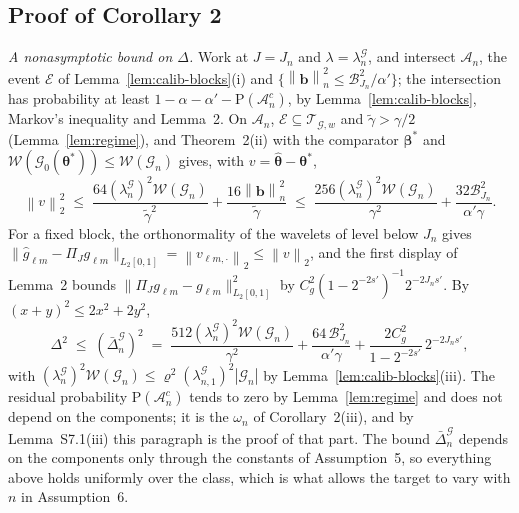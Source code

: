 \documentclass[10pt]{book}
\theoremstyle{definition}
\newcommand{\Prob}{\mathrm{P}}
\newcommand{\norm}[1]{\left\lVert #1 \right\rVert}
\newcommand{\normn}[1]{\left\lVert #1 \right\rVert_{n}}
\newcommand{\cv}{\ell}
\newcommand{\md}{m}
\newcommand{\gcomp}[2]{g_{#1#2}}
\newcommand{\PiJ}{\Pi_{J}}
\newcommand{\btheta}{\boldsymbol{\theta}}
\newcommand{\thetastar}{\btheta^{*}}
\newcommand{\thetahat}{\widehat{\btheta}}
\newcommand{\bbeta}{\boldsymbol{\beta}}
\newcommand{\betastar}{\bbeta^{*}}
\newcommand{\pen}{\lambda}
\newcommand{\seff}{s'}
\newcommand{\bb}{\mathbf{b}}
\newcommand{\gtil}{\widetilde{\gamma}}
\newcommand{\Gcal}{\mathcal{G}}
\newcommand{\Gzero}{\mathcal{G}_{0}}
\newcommand{\Wcal}{\mathcal{W}}
\newcommand{\lamG}{\lambda^{\mathcal{G}}_{n}}
\newcommand{\lamGone}{\lambda^{\mathcal{G}}_{n,1}}
\newcommand{\Tw}{\mathcal{T}_{\mathcal{G},w}}
\newcommand{\Ecal}{\mathcal{E}}
\newcommand{\Acal}{\mathcal{A}_{n}}
\begin{document}
{{\color{gray}\noindent[k = 4: the proof of Corollary~2 for the lasso, which stood
here, is moved to Section~S8, unchanged except for the numbering of the results
it cites.]\par}

\subsection*{Proof of Corollary 2}

\emph{A nonasymptotic bound on $\Delta$.} Work at $J = J_n$ and
$\pen = \lamG$, and intersect $\Acal$, the event $\Ecal$ of
Lemma~\ref{lem:calib-blocks}(i) and
$\{\normn{\bb}^{2} \le \mathcal{B}_{J_n}^{2}/\alpha'\}$; the intersection has
probability at least $1 - \alpha - \alpha' - \Prob(\Acal^{c})$, by
Lemma~\ref{lem:calib-blocks}, Markov's inequality and Lemma~2. On $\Acal$,
$\Ecal \subseteq \Tw$ and $\gtil > \gamma/2$ (Lemma~\ref{lem:regime}), and
Theorem~2(ii) with the comparator $\betastar$ and
$\Wcal(\Gzero(\thetastar)) \le \Wcal(\Gcal_{n})$ gives, with
$v = \thetahat - \thetastar$,
\[
  \norm{v}_{2}^{2} \;\le\; \frac{64(\lamG)^{2}\Wcal(\Gcal_{n})}{\gtil^{2}}
  + \frac{16\normn{\bb}^{2}}{\gtil}
  \;\le\; \frac{256(\lamG)^{2}\Wcal(\Gcal_{n})}{\gamma^{2}}
  + \frac{32\mathcal{B}^{2}_{J_n}}{\alpha'\gamma} .
\]
For a fixed block, the orthonormality of the wavelets of level below $J_n$
gives $\lVert\widehat{g}_{\cv\md} - \PiJ\gcomp{\cv}{\md}\rVert_{L_2[0,1]} =
\norm{v_{\cv\md,\cdot}}_2 \le \norm{v}_2$, and the first display of Lemma~2
bounds $\lVert\PiJ\gcomp{\cv}{\md} - \gcomp{\cv}{\md}\rVert^2_{L_2[0,1]}$ by
$C_g^2(1-2^{-2\seff})^{-1}2^{-2J_n\seff}$. By $(x+y)^2 \le 2x^2 + 2y^2$,
\begin{equation}
  \label{eq:Dn-blocks}
  \Delta^{2} \;\le\; (\bar{\Delta}^{\Gcal}_n)^{2} \;=\;
  \frac{512(\lamG)^{2}\Wcal(\Gcal_{n})}{\gamma^{2}}
  + \frac{64\,\mathcal{B}^2_{J_n}}{\alpha'\gamma}
  + \frac{2C_g^2}{1-2^{-2\seff}}\,2^{-2J_n\seff},
\end{equation}
with $(\lamG)^{2}\Wcal(\Gcal_{n}) \le \varrho^{2}(\lamGone)^{2}|\Gcal_{n}|$ by
Lemma~\ref{lem:calib-blocks}(iii). The residual probability
$\Prob(\Acal^{c})$ tends to zero by Lemma~\ref{lem:regime} and does not depend
on the components; it is the $\omega_n$ of Corollary~2(iii), and by
Lemma~S7.1(iii) this paragraph is the proof of that part. The bound
$\bar{\Delta}^{\Gcal}_n$ depends on the components only through the constants
of Assumption~5, so everything above holds uniformly over the class, which is
what allows the target to vary with $n$ in Assumption~6.

}
\end{document}
